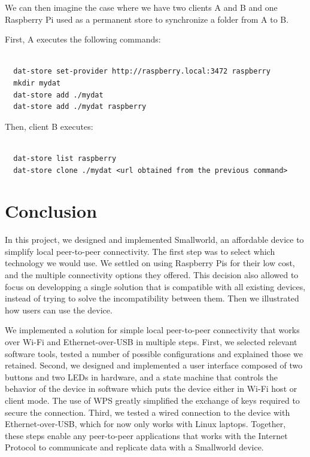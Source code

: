 \documentclass[a4paper,11pt,oneside]{report}
\begin{document}
We can then imagine the case where we have two clients A and B and one Raspberry Pi used as a permanent store to synchronize a folder from A to B.

First, A executes the following commands:
\begin{lstlisting}[label=cmd:dat_store_example_A, caption=Commands executed by client A]

  dat-store set-provider http://raspberry.local:3472 raspberry
  mkdir mydat
  dat-store add ./mydat
  dat-store add ./mydat raspberry
\end{lstlisting}

Then, client B executes:
\begin{lstlisting}[label=cmd:dat_store_example_A, caption=Commands executed by client A]

  dat-store list raspberry
  dat-store clone ./mydat <url obtained from the previous command>
\end{lstlisting}


\chapter{Conclusion}

In this project, we designed and implemented Smallworld, an affordable device to simplify local peer-to-peer connectivity. The first step was to select which technology we would use. We settled on using Raspberry Pis for their low cost, and the multiple connectivity options they offered. This decision also allowed to focus on developping a single solution that is compatible with all existing devices, instead of trying to solve the incompatibility between them. Then we illustrated how users can use the device.

We implemented a solution for simple local peer-to-peer connectivity that works over Wi-Fi and Ethernet-over-USB in multiple steps. First, we selected relevant software tools, tested a number of possible configurations and explained those we retained. Second, we designed and implemented a user interface composed of two buttons and two LEDs in hardware, and a state machine that controls the behavior of the device in software which puts the device either in Wi-Fi host or client mode. The use of WPS greatly simplified the exchange of keys required to secure the connection. Third, we tested a wired connection to the device with Ethernet-over-USB, which for now only works with Linux laptops. Together, these steps enable any peer-to-peer applications that works with the Internet Protocol to communicate and replicate data with a Smallworld device.
\end{document}
